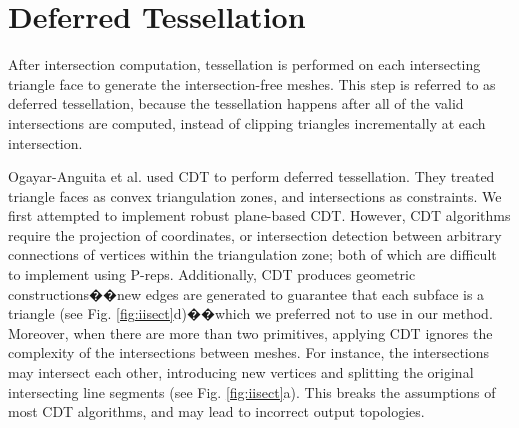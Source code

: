 
\section{Deferred Tessellation}


\label{sec:tessellation}

After intersection computation, tessellation is performed on each intersecting triangle face to generate the intersection-free meshes. This step is referred to as deferred tessellation, because the tessellation happens after all of the valid intersections are computed, instead of clipping triangles incrementally at each intersection.


Ogayar-Anguita et al. \cite{ogayar2015deferred} used CDT to perform deferred tessellation. They treated triangle faces as convex triangulation zones, and intersections as constraints. We first attempted to implement robust plane-based CDT. However, CDT algorithms \cite{chew1989constrained,preparata2012computational} require the projection of coordinates, or intersection detection between arbitrary connections of vertices within the triangulation zone; both of which are difficult to implement using P-reps. Additionally, CDT produces geometric constructions��new edges are generated to guarantee that each subface is a triangle (see Fig. \ref{fig:iisect}d)��which we preferred not to use in our method. Moreover, when there are more than two primitives, applying CDT ignores the complexity of the intersections between meshes. For instance, the intersections may intersect each other, introducing new vertices and splitting the original intersecting line segments (see Fig. \ref{fig:iisect}a). This breaks the assumptions of most CDT algorithms, and may lead to incorrect output topologies.

